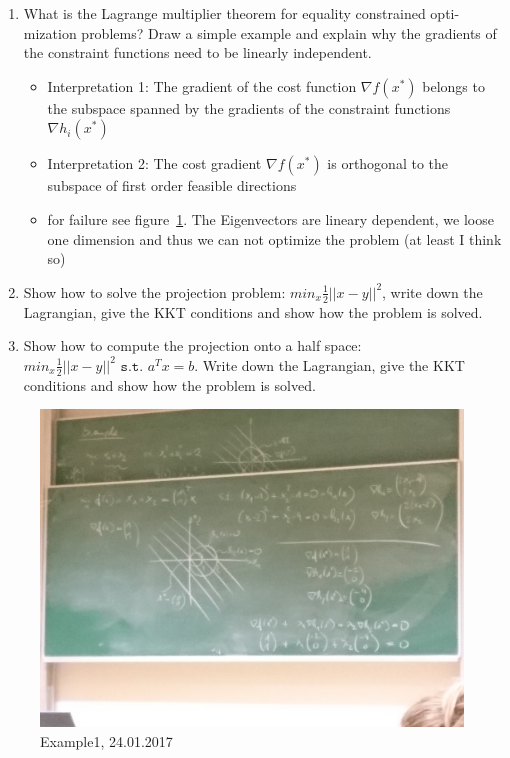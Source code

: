 \documentclass{report}
\newcommand{\question}[1]{{\small\textsf{#1}}}
\begin{document}
\begin{enumerate}
\item \question{What is the Lagrange multiplier theorem for equality constrained opti- mization
    problems? Draw a simple example and explain why the gradients of the constraint functions need
    to be linearly independent.}
  \begin{itemize}
  \item Interpretation 1: The gradient of the cost function $\nabla f (x^*)$ belongs to the subspace
    spanned by the gradients of the constraint functions $\nabla h_i (x^* )$
  \item Interpretation 2: The cost gradient $\nabla f (x^* )$ is orthogonal to the subspace of first
    order feasible directions
  \item for failure see figure~\ref{fig:ex1}. The Eigenvectors are lineary dependent, we loose one
    dimension and thus we can not optimize the problem (at least I think so)
  \end{itemize}

\item \question{Show how to solve the projection problem: $ min_x \frac{1}{2} ||x - y||^2$, write
    down the Lagrangian, give the KKT conditions and show how the problem is solved.}

\item \question{Show how to compute the projection onto a half space:
    $min_x \frac{1}{2}||x-y||^2 \texttt{ s.t. } a^Tx = b$. Write down the Lagrangian, give the KKT
    conditions and show how the problem is solved.}


\end{enumerate}
\begin{figure}[H]
\includegraphics[width=\textwidth]{2017_01_24-ex1.jpg}
\caption{Example1,  24.01.2017\label{fig:ex1}}
\end{figure}
\end{document}
